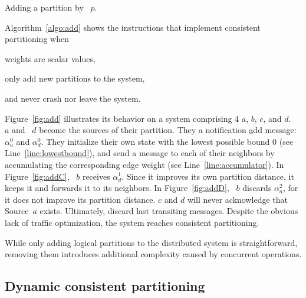 \begin{algorithm}
  
  \caption{\label{algo:add}Adding a partition by \Process~$p$.}
\end{algorithm}

Algorithm~\ref{algo:add} shows the instructions that implement
consistent partitioning when
\begin{inparaenum}[(i)]
\item weights are scalar values,
\item \processes only add new partitions to the system,
\item and \processes never crash nor leave the system.
\end{inparaenum}
Figure~\ref{fig:add} illustrates its behavior on a system comprising 4
\processes $a$, $b$, $c$, and $d$. \Process~$a$ and \Process~$d$
become the sources of their partition. They \NAMEB a notification
\underline{a}dd message: $\alpha_a^0$ and $\alpha_d^0$. They
initialize their own state with the lowest possible bound $0$ (see
Line~\ref{line:lowestbound}), and send a message to each of their
neighbors by accumulating the corresponding edge weight (see
Line~\ref{line:accumulator}). In Figure~\ref{fig:addC}, \Process~$b$
receives $\alpha_{d}^{1}$. Since it improves its own partition
distance, it keeps it and forwards it to its neighbors. In
Figure~\ref{fig:addD}, \Process~$b$ discards $\alpha_{a}^{2}$, for it
does not improve its partition distance. \Processes $c$ and $d$ will
never acknowledge that Source~$a$ exists. Ultimately, \processes
discard last transiting messages. Despite the obvious lack of traffic
optimization, the system reaches consistent partitioning.

While only adding logical partitions to the distributed system is
straightforward, removing them introduces additional complexity caused
by concurrent operations.

\subsection{Dynamic consistent partitioning}
\label{subsec:dynamic}


